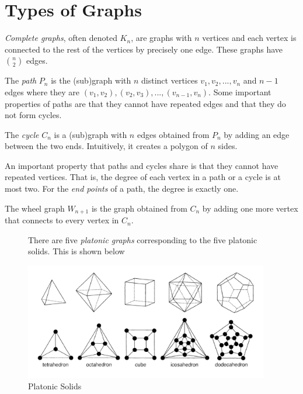 \section{Types of Graphs}

\begin{definition}
  \textit{Complete graphs}, often denoted \(K_n\), are graphs with \(n\) vertices and
  each vertex is connected to the rest of the vertices by precisely one edge.
  These graphs have \(\binom{n}{2}\) edges.
\end{definition}

\begin{definition}[Paths]
  The \textit{path} \(P_n\) is the (sub)graph with \(n\) distinct vertices \(v_1, v_2, ...,
  v_n\) and \(n-1\) edges where they are \((v_1, v_2), (v_2, v_3), ..., (v_{n-1}, v_n)\). Some important properties of paths are that they cannot have repeated edges and that they do not form cycles.
\end{definition}

\begin{definition}[Cycles]
  The \textit{cycle} \(C_n\) is a (sub)graph with \(n\) edges obtained from \(P_n\) by adding an
  edge between the two ends. Intuitively, it creates a polygon of \(n\) sides.
\end{definition}

An important property that paths and cycles share is that they cannot have
repeated vertices. That is, the degree of each vertex in a path or a cycle is at
most two. For the \textit{end points} of a path, the degree is exactly one.

\begin{definition}
  The wheel graph \(W_{n+1}\) is the graph obtained from \(C_n\) by adding one
  more vertex that connects to every vertex in \(C_n\).
\end{definition}

\begin{figure}[ht]
\begin{nexample}
  There are five \textit{platonic graphs} corresponding to the five platonic solids. This
  is shown below

  \begin{center}
    \includegraphics[width=0.95\textwidth]{figures/l01/platonic-solids}
  \end{center}
  \caption{Platonic Solids}\label{fig:l01-platonic-solids}
\end{nexample}
\end{figure}

